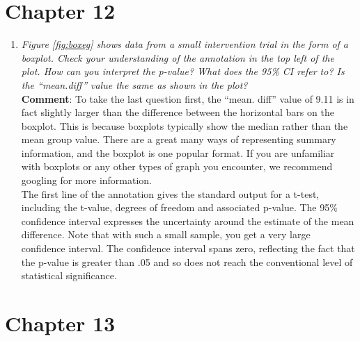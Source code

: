 \documentclass{krantz}
\providecommand{\tightlist}{%
\setlength{\itemsep}{0pt}\setlength{\parskip}{0pt}}
\begin{document}
\hypertarget{chapter-12}{%
\section{Chapter 12}\label{chapter-12}}


\begin{enumerate}
\def\labelenumi{\arabic{enumi}.}
\tightlist
\item
  \emph{Figure \ref{fig:boxeg} shows data from a small intervention trial in the form of a boxplot. Check your understanding of the annotation in the top left of the plot. How can you interpret the p-value? What does the 95\% CI refer to? Is the ``mean.diff'' value the same as shown in the plot?}\\
  \textbf{Comment}: To take the last question first, the ``mean. diff'' value of 9.11 is in fact slightly larger than the difference between the horizontal bars on the boxplot. This is because boxplots typically show the median rather than the mean group value. There are a great many ways of representing summary information, and the boxplot is one popular format. If you are unfamiliar with boxplots or any other types of graph you encounter, we recommend googling for more information.\\
  The first line of the annotation gives the standard output for a t-test, including the t-value, degrees of freedom and associated p-value. The 95\% confidence interval expresses the uncertainty around the estimate of the mean difference. Note that with such a small sample, you get a very large confidence interval. The confidence interval spans zero, reflecting the fact that the p-value is greater than .05 and so does not reach the conventional level of statistical significance.
\end{enumerate}

\hypertarget{chapter-13}{%
\section{Chapter 13}\label{chapter-13}}
\end{document}
